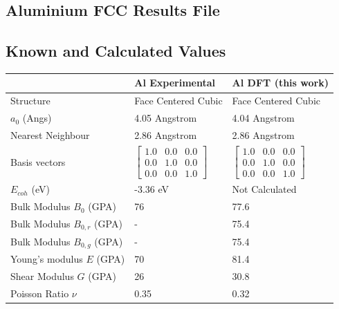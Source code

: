 \clearpage
\FloatBarrier
\subsection{Aluminium FCC Results File}





\FloatBarrier
\subsection{Known and Calculated Values}

\renewcommand{\arraystretch}{1.7}
\begin{table}[ht]
\renewcommand{\arraystretch}{1.2}
\begin{tabular}{lll}
\hline\hline
& Al Experimental & Al DFT (this work)  \\
\hline\hline
Structure                    & Face Centered Cubic & Face Centered Cubic  \\
$a_0$ (Angs)                 & 4.05 Angstrom       & 4.04 Angstrom \\
Nearest Neighbour            & 2.86 Angstrom       & 2.86 Angstrom \\
Basis vectors                & $\begin{bmatrix} 1.0 & 0.0 & 0.0 \\ 0.0 & 1.0 & 0.0 \\ 0.0 & 0.0 & 1.0 \end{bmatrix}$ & $\begin{bmatrix} 1.0 & 0.0 & 0.0 \\ 0.0 & 1.0 & 0.0 \\ 0.0 & 0.0 & 1.0 \end{bmatrix}$ \\
$E_{coh}$ (eV)               & -3.36 eV &  Not Calculated \\
Bulk Modulus $B_0$ (GPA)     & 76  & 77.6 \\
Bulk Modulus $B_{0,r}$ (GPA) & -   & 75.4 \\
Bulk Modulus $B_{0,g}$ (GPA) & -   & 75.4 \\
Young's modulus $E$ (GPA)    & 70  & 81.4 \\
Shear Modulus $G$ (GPA)      & 26  & 30.8 \\
Poisson Ratio $\nu$          & 0.35  & 0.32 \\

\end{tabular}
\end{table}

